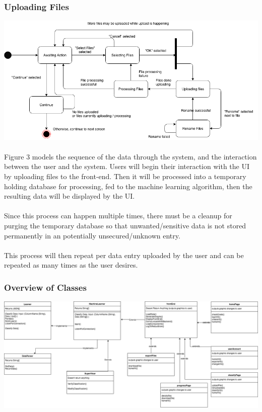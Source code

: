 \documentclass[12pt,oneside,letterpaper]{article}
\begin{document}
\subsubsection{Uploading Files}
\includegraphics[scale = 0.52]{spencer_state.png}
\begingroup
{}
\endgroup


\paragraph{}Figure 3 models the sequence of the data through the system, and the interaction between the user and the system. Users will begin their interaction with the UI by uploading files to the front-end. Then it will be processed into a temporary holding database for processing, fed to the machine learning algorithm, then the resulting data will be displayed by the UI.
\paragraph{} Since this process can happen multiple times, there must be a cleanup for purging the temporary database so that unwanted/sensitive data is not stored permanently in an potentially unsecured/unknown entry.
\paragraph{} This process will then repeat per data entry uploaded by the user and can be repeated as many times as the user desires.

\subsubsection{Overview of Classes}
\includegraphics[scale = 0.3]{YarmClassDiagram.png}
\begingroup
{}
\endgroup
\end{document}
